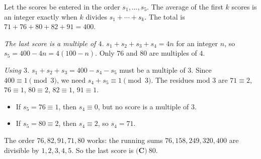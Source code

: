 Let the scores be entered in the order $s_1,\dots,s_5$. The average of the first $k$ scores is an integer exactly when $k$ divides $s_1+\cdots+s_k$. The total is $71+76+80+82+91=400$.

\emph{The last score is a multiple of $4$.} $s_1+s_2+s_3+s_4=4n$ for an integer $n$, so $s_5=400-4n=4(100-n)$. Only $76$ and $80$ are multiples of $4$.

\emph{Using $3$.} $s_1+s_2+s_3=400-s_4-s_5$ must be a multiple of $3$. Since $400\equiv1\pmod3$, we need $s_4+s_5\equiv1\pmod3$. The residues mod $3$ are $71\equiv2$, $76\equiv1$, $80\equiv2$, $82\equiv1$, $91\equiv1$.
\begin{itemize}
\item If $s_5=76\equiv1$, then $s_4\equiv0$, but no score is a multiple of $3$.
\item If $s_5=80\equiv2$, then $s_4\equiv2$, so $s_4=71$.
\end{itemize}
The order $76,82,91,71,80$ works: the running sums $76,158,249,320,400$ are divisible by $1,2,3,4,5$. So the last score is $\boxed{\textbf{(C)}\ 80}$.
